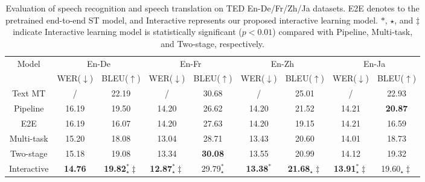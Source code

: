 \documentclass[letterpaper]{article} %
\begin{document}
\begin{table}[t]
	\centering
	\begin{tabular}{c|cc|cc|cc|cc}
		\hline
		\multirow{2}{*}{Model}    & \multicolumn{2}{c|}{En-De} & \multicolumn{2}{c|}{En-Fr} & \multicolumn{2}{c|}{En-Zh} & \multicolumn{2}{c}{En-Ja} \\
		\multicolumn{1}{c|}{}              & WER($\downarrow$)         & BLEU($\uparrow$)         & WER($\downarrow$)          & BLEU($\uparrow$)         & WER($\downarrow$)         & BLEU($\uparrow$)         & WER($\downarrow$)          & BLEU($\uparrow$)         \\ \cline{1-9}
		Text MT              & /              & 22.19           & /               & 30.68           & /              & 25.01           & /               & 22.93           \\
		\cline{1-9}
		Pipeline                                   & 16.19          & 19.50           & 14.20            & 26.62           & 14.20          & 21.52            & 14.21            &  \textbf{20.87}           \\
		E2E                                & 16.19          & 16.07           & 14.20            & 27.63           & 14.20          & 19.15           & 14.21            & 16.59           \\
		Multi-task                               & 15.20          & 18.08           & 13.04           & 28.71           & 13.43          & 20.60            & 14.01           & 18.73           \\
		Two-stage                              & 15.18          & 19.08           & 13.34           & \textbf{30.08}           & 13.55          & 20.99           & 14.12           & 19.32           \\
		\cline{1-9}
		Interactive   & \textbf{14.76}          & \textbf{19.82$_{\star}^{\ast}{\ddagger}$}           & \textbf{12.87$_{\star}^{\ast}{\ddagger}$}          & 29.79$_{\star}^{\ast}$           &  \textbf{13.38$^{\ast}$}          &  \textbf{21.68$_{\star}{\ddagger}$}           &  \textbf{13.91$_{\star}^{\ast}{\ddagger}$}           & 19.60$_{\star}\ddagger$           \\ 
		\hline
	\end{tabular}
	\caption{Evaluation of speech recognition and speech translation on TED En-De/Fr/Zh/Ja datasets. E2E denotes to the pretrained end-to-end ST model, and Interactive represents our proposed interactive learning model. %
		$\ast$, $\star$, and $\ddagger$ indicate Interactive learning model is statistically significant ($p<0.01$) compared with Pipeline, Multi-task, and Two-stage, respectively.}
	\label{tbl:overall}
\end{table}
\end{document}
